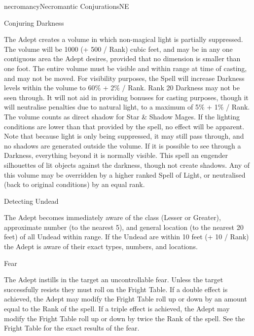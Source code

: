 \begin{College}[1.1]{necromancy}{Necromantic Conjurations}{NE}
\begin{spell}[G-3]{Conjuring Darkness}
\begin{effects}
The Adept creates a volume in which non-magical light is partially
suppressed.  The volume will be 1000 (+ 500 / Rank) cubic feet, and
may be in any one contiguous area the Adept desires, provided that no
dimension is smaller than one foot.  The entire volume must be visible
and within range at time of casting, and may not be moved.  For
visibility purposes, the Spell will increase Darkness levels within
the volume to 60\% + 2\% / Rank.  Rank 20 Darkness may not be seen
through. It will not aid in providing bonuses for casting purposes,
though it will neutralise penalties due to natural light, to a maximum
of 5\% + 1\% / Rank. The volume counts as direct shadow for Star \&
Shadow Mages.  If the lighting conditions are lower than that provided
by the spell, no effect will be apparent.  Note that because light is
only being suppressed, it may still pass through, and no shadows are
generated outside the volume. If it is possible to see through a
Darkness, everything beyond it is normally visible.  This spell an
engender silhouettes of lit objects against the darkness, though not
create shadows.  Any of this volume may be overridden by a higher
ranked Spell of Light, or neutralised (back to original conditions) by
an equal rank.
\end{effects}
\end{spell}

\begin{spell}[G-4]{Detecting Undead}
\begin{effects}
The Adept becomes immediately aware of the class (Lesser or Greater),
approximate number (to the nearest 5), and general location (to the
nearest 20 feet) of all Undead within range.  If the Undead are within
10 feet (+ 10 / Rank) the Adept is aware of their exact types,
numbers, and locations.
\end{effects}
\end{spell}

\begin{spell}[G-5]{Fear}
\begin{effects}
The Adept instills in the target an uncontrollable fear. Unless the
target successfully resists they must roll on the Fright Table.  If a
double effect is achieved, the Adept may modify the Fright Table roll
up or down by an amount equal to the Rank of the spell. If a triple
effect is achieved, the Adept may modify the Fright Table roll up or
down by twice the Rank of the spell. See the Fright Table for the
exact results of the fear.
\end{effects}
\end{spell}


\end{College}
